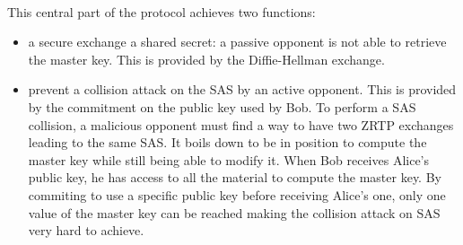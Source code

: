 \documentclass[a4paper,11pt]{article}
\begin{document}
\paragraph*{}This central part of the protocol achieves two functions:
\begin{itemize}
  \item a secure exchange a shared secret: a passive opponent is not able to retrieve the master key. This is provided by the Diffie-Hellman exchange.
  \item prevent a collision attack on the SAS by an active opponent. This is provided by the commitment on the public key used by Bob. To perform a SAS collision, a malicious opponent must find a way to have two ZRTP exchanges leading to the same SAS. It boils down to be in position to compute the master key while still being able to modify it. When Bob receives Alice's public key, he has access to all the material to compute the master key. By commiting to use a specific public key before receiving Alice's one, only one value of the master key can be reached making the collision attack on SAS very hard to achieve.
\end{itemize}
\end{document}
